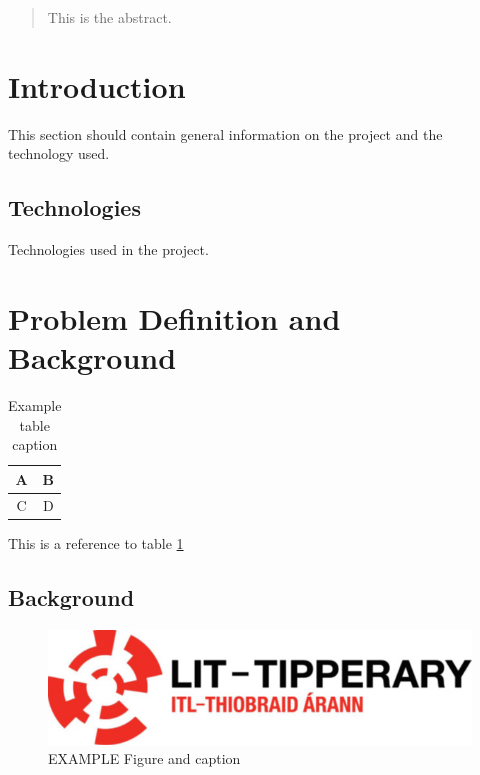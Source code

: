 \documentclass[12pt,a4paper,titlepage]{article}
\begin{document}


\begin{abstract}
This is the abstract.
\end{abstract}

\tableofcontents

\listoftables

\listoffigures

\lstlistoflistings

\newpage

\section{Introduction}
This section should contain general information on the project and the technology used.

\subsection{Technologies}
Technologies used in the project.

\section{Problem Definition and Background}

\begin{table}[H] %
\begin{center}
\caption{Example table caption}
\label{table:x Example table}
\begin{tabular}{ | c | c |}
\hline
A & B \\ 
\hline
C & D \\
\hline
\end{tabular}
\end{center}
\end{table}

This is a reference to table \ref{table:x Example table}

\subsection{Background}

\begin{figure}[H]
	\centering
    	\includegraphics[width=\textwidth]{Figures/lit_logo}
	\caption{EXAMPLE Figure and caption}
	\label{fig:example figure and caption}
\end{figure}
\end{document}
